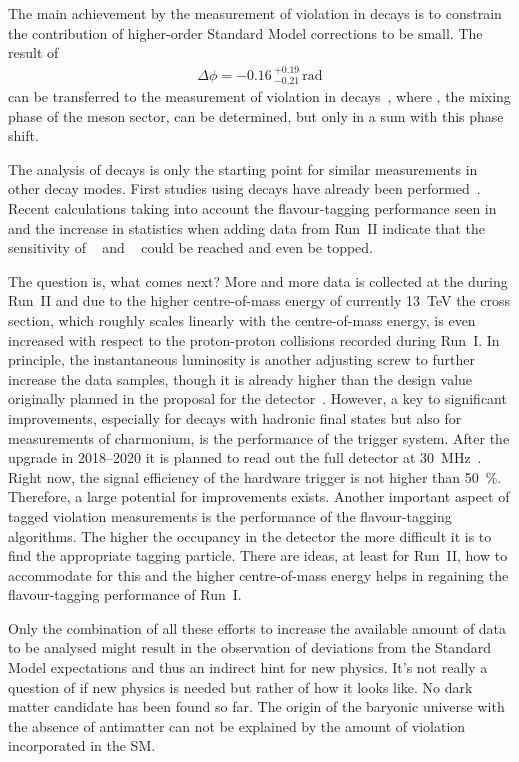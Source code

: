 The main achievement by the measurement of \CP violation in \BdToDD decays is
to constrain the contribution of higher-order Standard Model corrections to be
small. The result of
\begin{align*}
	\Delta \phi = -0.16\,^{+0.19}_{-0.21}\,\si{\radian}
\end{align*}
can be transferred to the measurement of \CP violation in \BsToDsDs
decays~\cite{LHCb-PAPER-2014-051}, where \phis, the mixing phase of the \Bs
meson sector, can be determined, but only in a sum with this phase shift.

The analysis of \BdToDD decays is only the starting point for similar
measurements in other \allBToDD decay modes. First studies using \BdToDstD
decays have already been performed~\cite{BToDstDthesis}. Recent calculations
taking into account the flavour-tagging performance seen in \BdToDD and the
increase in statistics when adding data from Run~II indicate that the
sensitivity of \babar~\cite{Aubert:2008ah} and \belle~\cite{Rohrken:2012ta}
could be reached and even be topped.

The question is, what comes next? More and more data is collected at the \lhc
during Run~II and due to the higher centre-of-mass energy of currently
\SI{13}{\TeV} the \bbbar cross section, which roughly scales linearly with the
centre-of-mass energy, is even increased with respect to the proton-proton
collisions recorded during Run~I. In principle, the instantaneous luminosity
is another adjusting screw to further increase the data samples, though it is
already higher than the design value originally planned in the proposal for
the detector~\cite{LHCb-Technical-Proposal}. However, a key to significant
improvements, especially for decays with hadronic final states but also for
measurements of charmonium, is the performance of the trigger system. After
the upgrade in 2018--2020 it is planned to read out the full detector at
\SI{30}{\mega\hertz}~\cite{LHCb-TDR-016}. Right now, the signal efficiency of
the hardware trigger is not higher than \SI{50}{\percent}. Therefore, a large
potential for improvements exists. Another important aspect of tagged \CP
violation measurements is the performance of the flavour-tagging algorithms.
The higher the occupancy in the detector the more difficult it is to find the
appropriate tagging particle. There are ideas, at least for Run~II, how to
accommodate for this and the higher centre-of-mass energy helps in regaining
the flavour-tagging performance of Run~I.

Only the combination of all these efforts to increase the available amount of
data to be analysed might result in the observation of deviations from the
Standard Model expectations and thus an indirect hint for new physics. It's
not really a question of if new physics is needed but rather of how it looks
like. No dark matter candidate has been found so far. The origin of the
baryonic universe with the absence of antimatter can not be explained by the
amount of \CP violation incorporated in the SM.

